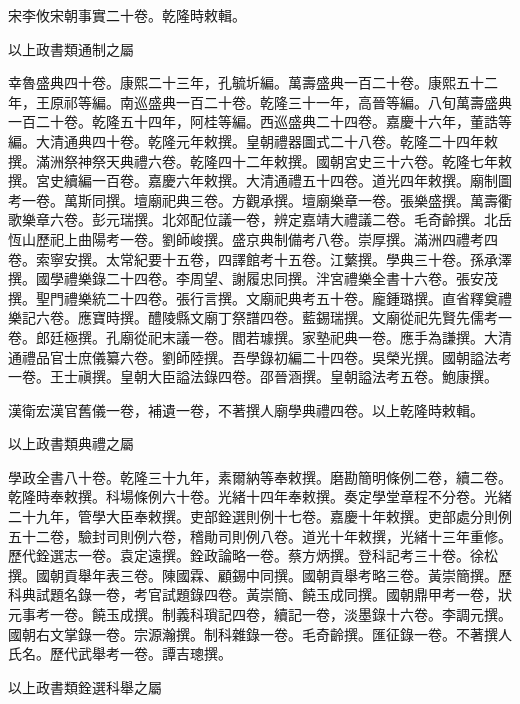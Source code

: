 \begin{pinyinscope}
宋李攸宋朝事實二十卷。乾隆時敕輯。

以上政書類通制之屬

幸魯盛典四十卷。康熙二十三年，孔毓圻編。萬壽盛典一百二十卷。康熙五十二年，王原祁等編。南巡盛典一百二十卷。乾隆三十一年，高晉等編。八旬萬壽盛典一百二十卷。乾隆五十四年，阿桂等編。西巡盛典二十四卷。嘉慶十六年，董誥等編。大清通典四十卷。乾隆元年敕撰。皇朝禮器圖式二十八卷。乾隆二十四年敕撰。滿洲祭神祭天典禮六卷。乾隆四十二年敕撰。國朝宮史三十六卷。乾隆七年敕撰。宮史續編一百卷。嘉慶六年敕撰。大清通禮五十四卷。道光四年敕撰。廟制圖考一卷。萬斯同撰。壇廟祀典三卷。方觀承撰。壇廟樂章一卷。張樂盛撰。萬壽衢歌樂章六卷。彭元瑞撰。北郊配位議一卷，辨定嘉靖大禮議二卷。毛奇齡撰。北岳恆山歷祀上曲陽考一卷。劉師峻撰。盛京典制備考八卷。崇厚撰。滿洲四禮考四卷。索寧安撰。太常紀要十五卷，四譯館考十五卷。江蘩撰。學典三十卷。孫承澤撰。國學禮樂錄二十四卷。李周望、謝履忠同撰。泮宮禮樂全書十六卷。張安茂撰。聖門禮樂統二十四卷。張行言撰。文廟祀典考五十卷。龐鍾璐撰。直省釋奠禮樂記六卷。應寶時撰。醴陵縣文廟丁祭譜四卷。藍錫瑞撰。文廟從祀先賢先儒考一卷。郎廷極撰。孔廟從祀末議一卷。閻若璩撰。家塾祀典一卷。應手為謙撰。大清通禮品官士庶儀纂六卷。劉師陸撰。吾學錄初編二十四卷。吳榮光撰。國朝謚法考一卷。王士禛撰。皇朝大臣謚法錄四卷。邵晉涵撰。皇朝謚法考五卷。鮑康撰。

漢衛宏漢官舊儀一卷，補遺一卷，不著撰人廟學典禮四卷。以上乾隆時敕輯。

以上政書類典禮之屬

學政全書八十卷。乾隆三十九年，素爾納等奉敕撰。磨勘簡明條例二卷，續二卷。乾隆時奉敕撰。科場條例六十卷。光緒十四年奉敕撰。奏定學堂章程不分卷。光緒二十九年，管學大臣奉敕撰。吏部銓選則例十七卷。嘉慶十年敕撰。吏部處分則例五十二卷，驗封司則例六卷，稽勛司則例八卷。道光十年敕撰，光緒十三年重修。歷代銓選志一卷。袁定遠撰。銓政論略一卷。蔡方炳撰。登科記考三十卷。徐松撰。國朝貢舉年表三卷。陳國霖、顧錫中同撰。國朝貢舉考略三卷。黃崇簡撰。歷科典試題名錄一卷，考官試題錄四卷。黃崇簡、饒玉成同撰。國朝鼎甲考一卷，狀元事考一卷。饒玉成撰。制義科瑣記四卷，續記一卷，淡墨錄十六卷。李調元撰。國朝右文掌錄一卷。宗源瀚撰。制科雜錄一卷。毛奇齡撰。匯征錄一卷。不著撰人氏名。歷代武舉考一卷。譚吉璁撰。

以上政書類銓選科舉之屬


\end{pinyinscope}
